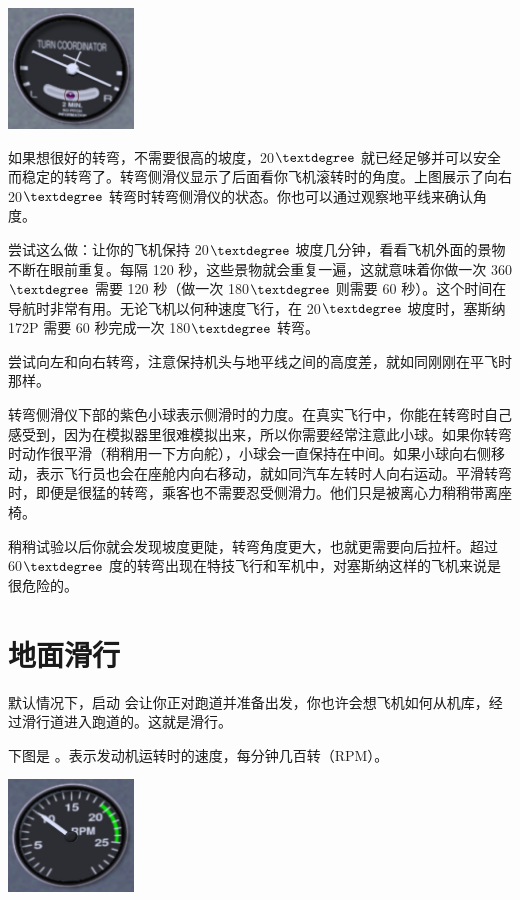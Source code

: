 \begin{center}
\includegraphics[width=0.25\textwidth]{img/tut_19}
\end{center}

如果想很好的转弯，不需要很高的坡度，20$\textdegree$ 就已经足够并可以安全而稳定的转弯了。转弯侧滑仪显示了后面看你飞机滚转时的角度。上图展示了向右 20$\textdegree$ 转弯时转弯侧滑仪的状态。你也可以通过观察地平线来确认角度。

尝试这么做：让你的飞机保持 20$\textdegree$ 坡度几分钟，看看飞机外面的景物不断在眼前重复。每隔 120 秒，这些景物就会重复一遍，这就意味着你做一次 360$\textdegree$ 需要 120 秒（做一次 180$\textdegree$ 则需要 60 秒）。这个时间在导航时非常有用。无论飞机以何种速度飞行，在 20$\textdegree$ 坡度时，塞斯纳 172P 需要 60 秒完成一次 180$\textdegree$ 转弯。

尝试向左和向右转弯，注意保持机头与地平线之间的高度差，就如同刚刚在平飞时那样。

转弯侧滑仪下部的紫色小球表示侧滑时的力度。在真实飞行中，你能在转弯时自己感受到，因为在模拟器里很难模拟出来，所以你需要经常注意此小球。如果你转弯时动作很平滑（稍稍用一下方向舵），小球会一直保持在中间。如果小球向右侧移动，表示飞行员也会在座舱内向右移动，就如同汽车左转时人向右运动。平滑转弯时，即便是很猛的转弯，乘客也不需要忍受侧滑力。他们只是被离心力稍稍带离座椅。

稍稍试验以后你就会发现坡度更陡，转弯角度更大，也就更需要向后拉杆。超过 60$\textdegree$ 度的转弯出现在特技飞行和军机中，对塞斯纳这样的飞机来说是很危险的。

\section{地面滑行}
\label{sec:TaxiTurning}

默认情况下，启动 \FlightGear{} 会让你正对跑道并准备出发，你也许会想飞机如何从机库，经过滑行道进入跑道的。这就是滑行。

下图是 。表示发动机运转时的速度，每分钟几百转（RPM）。

\begin{center}
\includegraphics[width=0.25\textwidth]{img/tut_20}
\end{center}

